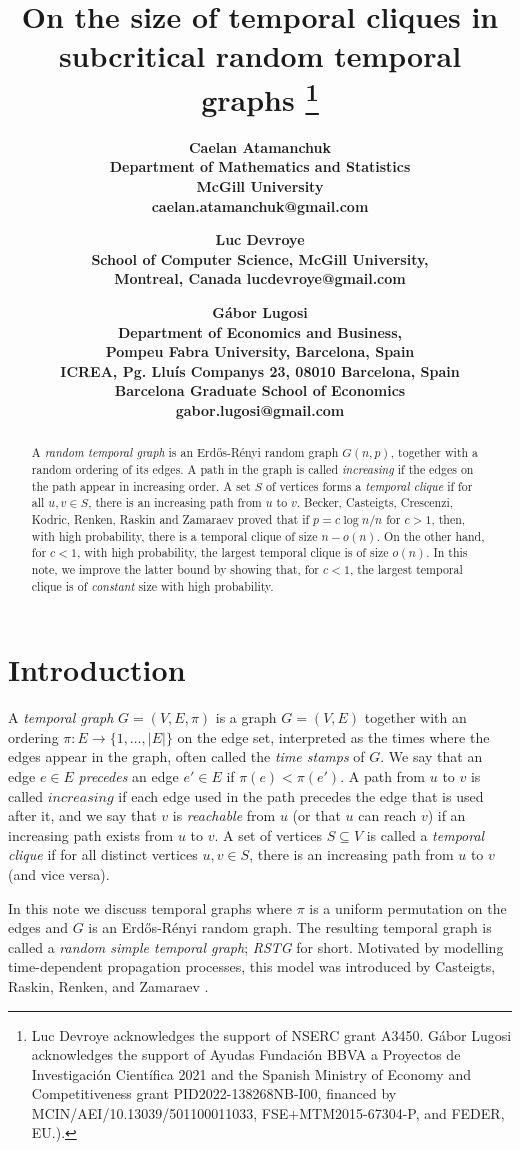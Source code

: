 \documentclass[11pt]{article}
\title{\bf{On the size of temporal cliques in subcritical random temporal graphs}
  \thanks{Luc Devroye acknowledges the support of NSERC grant A3450.
    G\'abor Lugosi acknowledges the support of Ayudas Fundación BBVA a
Proyectos de Investigación Científica 2021 and
the Spanish Ministry of Economy and Competitiveness grant PID2022-138268NB-I00, financed by MCIN/AEI/10.13039/501100011033,
FSE+MTM2015-67304-P, and FEDER, EU.).}
}
\author{
\bf{Caelan Atamanchuk} \\
Department of Mathematics and Statistics \\
McGill University \\
caelan.atamanchuk@gmail.com
\and
\bf{Luc Devroye} \\
School of Computer Science, McGill University, \\
  Montreal, Canada
lucdevroye@gmail.com
\and
\bf{G\'{a}bor Lugosi} \\
Department of Economics and Business, \\
Pompeu  Fabra University, Barcelona, Spain \\
ICREA, Pg. Lluís Companys 23, 08010 Barcelona, Spain \\
Barcelona Graduate School of Economics \\
gabor.lugosi@gmail.com
}
\newcommand{\1}{\mathbf{1}} %
\begin{document}

\maketitle


\begin{abstract}
  A \emph{random temporal graph} is an Erd\H{o}s-R\'enyi random graph $G(n,p)$, together with a random
  ordering of its edges. A path in the graph is called \emph{increasing} if the edges on the path appear
  in increasing order. A set $S$ of vertices forms a \emph{temporal clique} if for all $u,v \in S$, there is an increasing path from $u$ to $v$.
  Becker, Casteigts, Crescenzi, Kodric, Renken, Raskin and Zamaraev \cite{Becker2023} proved that if $p=c\log n/n$ for $c>1$, then,  with high probability, there
  is a temporal clique of size $n-o(n)$. On the other hand, for $c<1$,   with high probability,
  the largest temporal clique is of size $o(n)$.
  In this note, we improve the latter bound by showing that, for $c<1$, the largest temporal clique
  is of \emph{constant} size with high probability. 
\end{abstract}


\section{Introduction}\label{intro}

A \textit{temporal graph} $G = (V,E,\pi)$ is a graph $G=(V,E)$ together with an ordering $\pi:E \to \{1,\ldots,|E|\}$ on the edge set, interpreted as the times where the edges appear in the graph, often called the \textit{time stamps} of $G$. We say that an edge $e \in E$ \textit{precedes} an edge $e' \in E$ if $\pi(e) < \pi(e')$. A path from $u$ to $v$ is called $\textit{increasing}$ if each edge used in the path precedes the edge that is used after it, and we say that $v$ is \textit{reachable} from $u$ (or that $u$ can reach $v$) if an increasing path exists from $u$ to $v$. A set of vertices $S \subseteq V$ is called a \emph{temporal clique} if for all distinct vertices $u,v \in S$, there is an increasing path from $u$ to $v$ (and vice versa).


In this note we discuss temporal graphs where $\pi$ is a uniform permutation on the edges and $G$ is an Erd\H{o}s-R\'{e}nyi random graph. The resulting temporal graph is called a \textit{random simple temporal graph}; \textit{RSTG} for short.
Motivated by modelling time-dependent propagation processes,
this model was introduced by Casteigts, Raskin, Renken, and Zamaraev \cite{Casteigts2023}.
\end{document}
